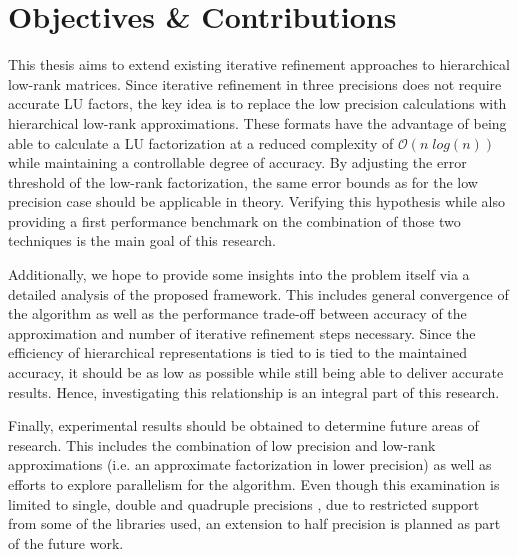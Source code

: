 \section{Objectives \& Contributions}
\label{sec:objectives}

This thesis aims to extend existing iterative refinement approaches to hierarchical low-rank matrices. Since iterative refinement in three precisions does not require accurate LU factors, the key idea is to replace the low precision calculations with hierarchical low-rank approximations. These formats have the advantage of being able to calculate a LU factorization at a reduced complexity of $\mathcal{O}(n\;log(n))$ while maintaining a controllable degree of accuracy. By adjusting the error threshold of the low-rank factorization, the same error bounds as for the low precision case should be applicable in theory. Verifying this hypothesis while also providing a first performance benchmark on the combination of those two techniques is the main goal of this research.

Additionally,  we hope to provide some insights into the problem itself via a detailed analysis of the  proposed framework. This includes general convergence of the algorithm as well as the performance trade-off between accuracy of the approximation and number of iterative refinement steps necessary. Since the efficiency of hierarchical representations is tied to is tied to the maintained accuracy, it should be as low as possible while still being able to deliver accurate results. Hence, investigating this relationship is an integral part of this research. 

Finally, experimental results should be obtained to determine future areas of research. This includes the combination of low precision and low-rank approximations (i.e. an approximate factorization in lower precision) as well as efforts to explore parallelism for the algorithm. Even though this examination is limited to single, double and quadruple precisions \cite{institute_of_electrical_and_electronics_engineers_ieee_2008}, due to restricted support from some of the libraries used, an extension to half precision is planned as part of the future work.

